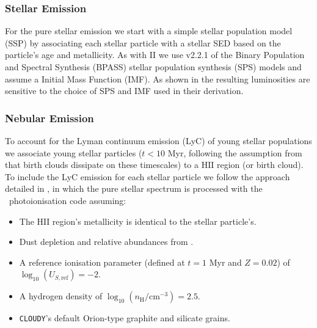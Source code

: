 \subsubsection{Stellar Emission}

For the pure stellar emission we start with a simple stellar population model (SSP) by associating each stellar particle with a stellar SED based on the particle's age and metallicity. As with \flares\-II we use v2.2.1 of the Binary Population and Spectral Synthesis (BPASS) stellar population synthesis (SPS) models \citep{BPASS2.2.1} and assume a \cite{chabrier_galactic_2003} Initial Mass Function (IMF). As shown in \cite{Wilkins2016a,Wilkins2017,Wilkins2018} the resulting luminosities are sensitive to the choice of SPS and IMF used in their derivation. 


\subsubsection{Nebular Emission}

To account for the Lyman continuum emission (LyC) of young stellar populations we associate young stellar particles ($t < 10$ Myr, following the assumption from \cite{Charlot_and_Fall2003} that birth clouds dissipate on these timescales) to a $\mathrm{HII}$ region (or birth cloud). To include the LyC emission for each stellar particle we follow the approach detailed in \cite{Wilkins2020}, in which the pure stellar spectrum is processed with the \cloudy\ photoionisation code \citep{Ferland2017} assuming:

\begin{itemize}
    \item The $\mathrm{HII}$ region's metallicity is identical to the stellar particle's.
    \item Dust depletion and relative abundances from \cite{Gutkin2016}.
    \item A reference ionisation parameter (defined at $t=1$ Myr and $Z=0.02$) of $\log_{10}(U_{S,\mathrm{ref}})=-2$.
    \item A hydrogen density of $\log_{10}(n_{\mathrm{H}}/\mathrm{cm}^{-3})=2.5$.
    \item \texttt{CLOUDY}'s default Orion-type graphite and silicate grains.
\end{itemize}


